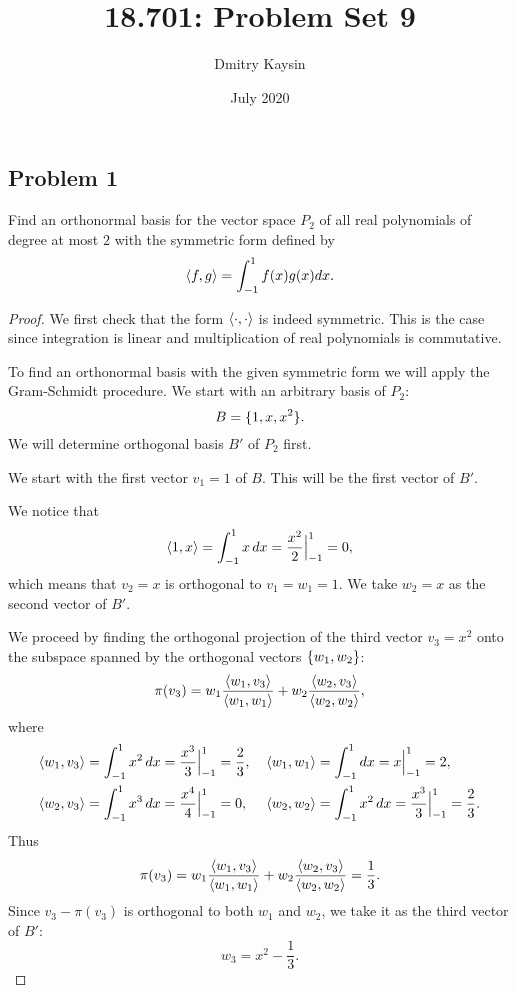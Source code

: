 \documentclass{article}
\title{18.701: Problem Set 9}
\author{Dmitry Kaysin}
\date{July 2020}
\theoremstyle{definition}
\DeclarePairedDelimiter\set{\{}{\}}
\DeclarePairedDelimiter\bilform{\langle}{\rangle}
\newcommand{\evalat}[2]{\Big|_{#1}^{#2}}
\begin{document}
\maketitle 


\subsection*{Problem 1}

\begin{tcolorbox}
Find an orthonormal basis for the vector space $P_2$ of all real polynomials of degree at most $2$ with the symmetric form defined by 
\[
    \bilform{f,g} = \int_{-1}^1 f(x) g(x) dx .
\]
\end{tcolorbox}

\begin{proof}

We first check that the form $\bilform{\cdot,\cdot}$ is indeed symmetric.
This is the case since integration is linear and multiplication of real polynomials is commutative.

To find an orthonormal basis with the given symmetric form we will apply the Gram-Schmidt procedure.
We start with an arbitrary basis of $P_2$:
\[
    B = \set{1, x, x^2}.
\]
We will determine orthogonal basis $B'$ of $P_2$ first.

We start with the first vector $v_1 = 1$ of $B$.
This will be the first vector of $B'$.

We notice that
\[
    \bilform{1,x} = \int^1_{-1} x \, dx = \frac{x^2}{2} \evalat{-1}{1} = 0,
\]
which means that $v_2 = x$ is orthogonal to $v_1 = w_1 = 1$.
We take $w_2 = x$ as the second vector of $B'$.

We proceed by finding the orthogonal projection of the third vector $v_3 = x^2$ onto the subspace spanned by the orthogonal vectors $\set{w_1, w_2}$:
\[
    \pi(v_3) = w_1 \frac{\bilform{w_1, v_3}}{\bilform{w_1,w_1}} + w_2 \frac{\bilform{w_2, v_3}}{\bilform{w_2,w_2}},
\]
where
\begin{align*}
    \bilform{w_1, v_3} & = \int^1_{-1} x^2 \, dx 
    = \frac{x^3}{3} \evalat{-1}{1} = \frac{2}{3}, \>
    && \bilform{w_1, w_1} 
        = \int^1_{-1} dx = x \evalat{-1}{1} = 2, \\
    \bilform{w_2, v_3} & = \int^1_{-1} x^3 \, dx
    = \frac{x^4}{4} \evalat{-1}{1} = 0,
    && \bilform{w_2, w_2} 
        = \int^1_{-1} x^2 \, dx = \frac{x^3}{3} \evalat{-1}{1} = \frac{2}{3}.
\end{align*}
Thus
\[
    \pi(v_3) = w_1 \frac{\bilform{w_1, v_3}}{\bilform{w_1,w_1}} + w_2 \frac{\bilform{w_2, v_3}}{\bilform{w_2,w_2}}
    = \frac{1}{3}.
\]
Since $v_3 - \pi(v_3)$ is orthogonal to both $w_1$ and $w_2$, we take it as the third vector of $B'$:
\[
    w_3 = x^2 - \frac{1}{3}.
\]


\end{proof}
\end{document}

